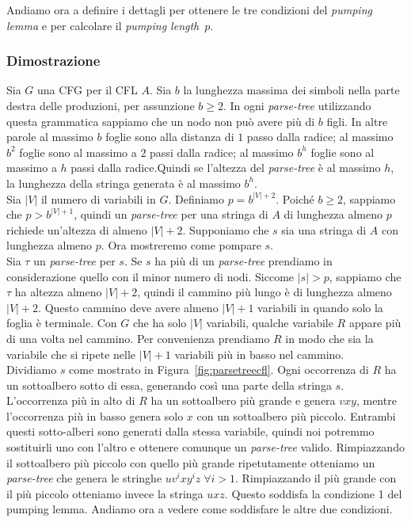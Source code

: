 \documentclass[italian]{article}
\newcommand{\len}[1]{\text{$|#1|$}}
\begin{document}
	\noindent
	Andiamo ora a definire i dettagli per ottenere le tre condizioni del \textit{pumping lemma} e per calcolare il \textit{pumping length}~$p$.
	\pagebreak
	\subsubsection{Dimostrazione}
	Sia $G$ una CFG per il CFL $A$. Sia $b$ la lunghezza massima dei simboli nella parte destra delle produzioni, per assunzione $b \geq 2$. In ogni \textit{parse-tree} utilizzando questa grammatica sappiamo che un nodo non può avere più di $b$ figli. In altre parole al massimo $b$ foglie sono alla distanza di $1$ passo dalla radice; al massimo $b^2$ foglie sono al massimo a $2$ passi dalla radice; al massimo $b^h$ foglie sono al massimo a $h$ passi dalla radice.Quindi se l'altezza del \textit{parse-tree} è al massimo $h$, la lunghezza della stringa generata è al massimo $b^h$. \\
	
	\noindent
	Sia $\len{V}$ il numero di variabili in $G$. Definiamo $p = b^{\len{V}+2}$. Poiché $b \geq 2$, sappiamo che $p > b^{\len{V}+1}$, quindi un \textit{parse-tree} per una stringa di $A$ di lunghezza almeno $p$ richiede un'altezza di almeno $\len{V} + 2$. Supponiamo che $s$ sia una stringa di $A$ con lunghezza almeno $p$. Ora mostreremo come pompare $s$. \\
	
	\noindent
	Sia $\tau$ un \textit{parse-tree} per $s$. Se $s$ ha più di un \textit{parse-tree} prendiamo in considerazione quello con il minor numero di nodi. Siccome $\len{s} > p$, sappiamo che $\tau$ ha altezza almeno $\len{V}+2$, quindi il cammino più lungo è di lunghezza almeno $\len{V}+2$. Questo cammino deve avere almeno $\len{V}+1$ variabili in quando solo la foglia è terminale. Con $G$ che ha solo $\len{V}$ variabili, qualche variabile $R$ appare più di una volta nel cammino. Per convenienza prendiamo $R$ in modo che sia la variabile che si ripete nelle $\len{V}+1$ variabili più in basso nel cammino. \\
	
	\noindent
	Dividiamo $s$ come mostrato in Figura~\ref{fig:parsetreecfl}. Ogni occorrenza di $R$ ha un sottoalbero sotto di essa, generando così una parte della stringa $s$. L'occorrenza più in alto di $R$ ha un sottoalbero più grande e genera $vxy$, mentre l'occorrenza più in basso genera solo $x$ con un sottoalbero più piccolo. Entrambi questi sotto-alberi sono generati dalla stessa variabile, quindi noi potremmo sostituirli uno con l'altro e ottenere comunque un \textit{parse-tree} valido. Rimpiazzando il sottoalbero più piccolo con quello più grande ripetutamente otteniamo un \textit{parse-tree} che genera le stringhe $uv^ixy^iz \; \forall i > 1$. Rimpiazzando il più grande con il più piccolo otteniamo invece la stringa $uxz$. Questo soddisfa la condizione 1 del pumping lemma. Andiamo ora a vedere come soddisfare le altre due condizioni.\\
	
\end{document}

